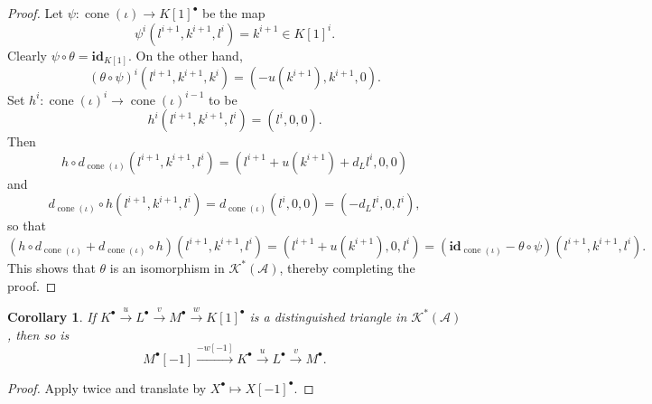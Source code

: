 \documentclass[11pt]{article}
\theoremstyle{thmstyle}
\theoremstyle{defstyle}
\newtheorem{corollary}[theorem]{Corollary}
\newcommand{\id}{\mathbf{id}}
\newcommand{\scrA}{\mathscr{A}}
\newcommand{\scrK}{\mathscr{K}}
\newcommand{\cone}{\operatorname{cone}}
\begin{document}
\begin{proof}
	Let $\psi\colon\cone(\iota)\to K[1]^\bullet$ be the map 
	\begin{equation*}
		\psi^i\left(l^{i + 1}, k^{i + 1}, l^i\right) = k^{i + 1}\in K[1]^i.
	\end{equation*}
	Clearly $\psi\circ\theta = \id_{K[1]}$. On the other hand, 
	\begin{equation*}
		\left(\theta\circ\psi\right)^i\left(l^{i + 1}, k^{i + 1}, k^i\right) = \left(-u(k^{i + 1}), k^{i + 1}, 0\right).
	\end{equation*}
	Set $h^i\colon\cone(\iota)^i\to\cone(\iota)^{i - 1}$ to be 
	\begin{equation*}
		h^i\left(l^{i + 1}, k^{i + 1}, l^i\right) = \left(l^i, 0, 0\right).
	\end{equation*}
	Then 
	\begin{equation*}
		h\circ d_{\cone(\iota)}\left(l^{i + 1}, k^{i + 1}, l^i\right) = \left(l^{i + 1} + u(k^{i + 1}) + d_L l^i, 0, 0\right)
	\end{equation*}
	and 
	\begin{equation*}
		d_{\cone(\iota)}\circ h\left(l^{i + 1}, k^{i + 1}, l^i\right) = d_{\cone(\iota)}\left(l^i, 0, 0\right) = \left(-d_L l^i, 0, l^i\right),
	\end{equation*}
	so that 
	\begin{equation*}
		\left(h\circ d_{\cone(\iota)} + d_{\cone(\iota)}\circ h\right)\left(l^{i + 1}, k^{i + 1}, l^i\right) = \left(l^{i + 1} + u(k^{i + 1}), 0, l^i\right) = \left(\id_{\cone(\iota)} - \theta\circ\psi\right)\left(l^{i + 1}, k^{i + 1}, l^i\right).
	\end{equation*}
	This shows that $\theta$ is an isomorphism in $\scrK^\ast(\scrA)$, thereby completing the proof.
\end{proof}

\begin{corollary}
	If $K^\bullet\xrightarrow{u} L^\bullet\xrightarrow{v} M^\bullet\xrightarrow{w} K[1]^\bullet$ is a distinguished triangle in $\scrK^\ast(\scrA)$, then so is
	\begin{equation*}
		M^\bullet[-1]\xrightarrow{-w[-1]} K^\bullet\xrightarrow{u} L^\bullet\xrightarrow{v} M^\bullet.
	\end{equation*}
\end{corollary}
\begin{proof}
	Apply  twice and translate by $X^\bullet\mapsto X[-1]^\bullet$.
\end{proof}
\end{document}
